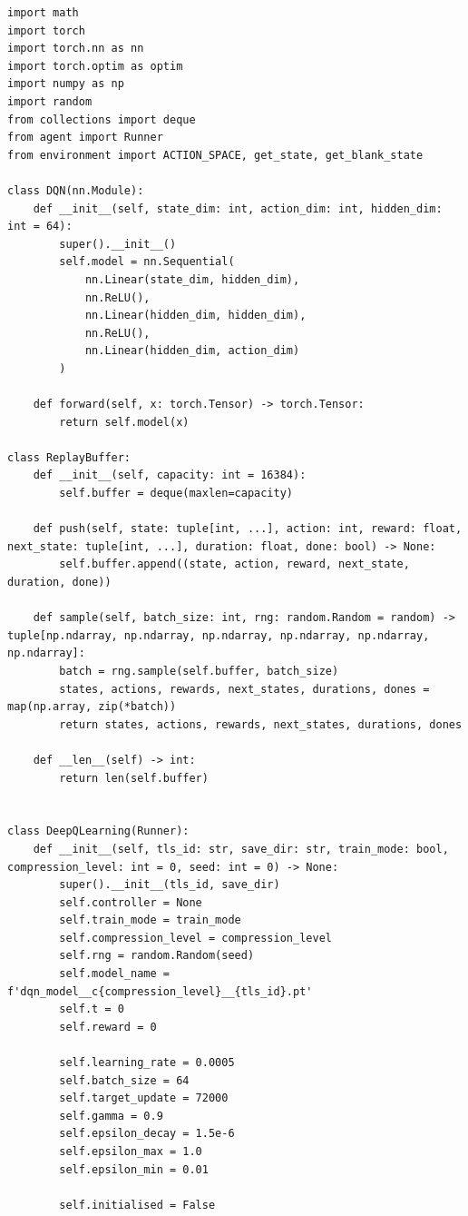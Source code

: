\documentclass[a4paper]{report}
\begin{document}
\begin{lstlisting}[style=pythonstyle]
import math
import torch
import torch.nn as nn
import torch.optim as optim
import numpy as np
import random
from collections import deque
from agent import Runner
from environment import ACTION_SPACE, get_state, get_blank_state

class DQN(nn.Module):
    def __init__(self, state_dim: int, action_dim: int, hidden_dim: int = 64):
        super().__init__()
        self.model = nn.Sequential(
            nn.Linear(state_dim, hidden_dim),
            nn.ReLU(),
            nn.Linear(hidden_dim, hidden_dim),
            nn.ReLU(),
            nn.Linear(hidden_dim, action_dim)
        )

    def forward(self, x: torch.Tensor) -> torch.Tensor:
        return self.model(x)
    
class ReplayBuffer:
    def __init__(self, capacity: int = 16384):
        self.buffer = deque(maxlen=capacity)

    def push(self, state: tuple[int, ...], action: int, reward: float, next_state: tuple[int, ...], duration: float, done: bool) -> None:
        self.buffer.append((state, action, reward, next_state, duration, done))

    def sample(self, batch_size: int, rng: random.Random = random) -> tuple[np.ndarray, np.ndarray, np.ndarray, np.ndarray, np.ndarray, np.ndarray]:
        batch = rng.sample(self.buffer, batch_size)
        states, actions, rewards, next_states, durations, dones = map(np.array, zip(*batch))
        return states, actions, rewards, next_states, durations, dones
    
    def __len__(self) -> int:
        return len(self.buffer)


class DeepQLearning(Runner):
    def __init__(self, tls_id: str, save_dir: str, train_mode: bool, compression_level: int = 0, seed: int = 0) -> None:
        super().__init__(tls_id, save_dir)
        self.controller = None
        self.train_mode = train_mode
        self.compression_level = compression_level
        self.rng = random.Random(seed)
        self.model_name = f'dqn_model__c{compression_level}__{tls_id}.pt'
        self.t = 0
        self.reward = 0

        self.learning_rate = 0.0005
        self.batch_size = 64
        self.target_update = 72000
        self.gamma = 0.9
        self.epsilon_decay = 1.5e-6
        self.epsilon_max = 1.0
        self.epsilon_min = 0.01

        self.initialised = False


\end{lstlisting}
\end{document}

